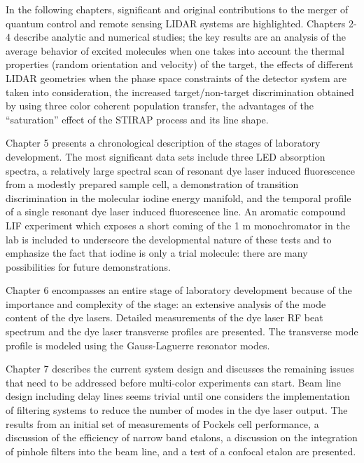 In the following chapters, significant and original contributions to the merger of quantum control and remote sensing LIDAR systems are highlighted. Chapters 2-4 describe analytic and numerical studies; the key results are an analysis of the average behavior of excited molecules when one takes into account the thermal properties (random orientation and velocity) of the target, the effects of different LIDAR geometries when the phase space constraints of the detector system are taken into consideration, the increased target/non-target discrimination obtained by using three color coherent population transfer, the advantages of the ``saturation'' effect of the STIRAP process and its line shape.

Chapter 5 presents a chronological description of the stages of laboratory development. The most significant data sets include three LED absorption spectra, a relatively large spectral scan of resonant dye laser induced fluorescence from a modestly prepared sample cell, a demonstration of transition discrimination in the molecular iodine energy manifold, and the temporal profile of a single resonant dye laser induced fluorescence line. An aromatic compound LIF experiment which exposes a short coming of the 1 m monochromator in the lab is included to underscore the developmental nature of these tests and to emphasize the fact that iodine is only a trial molecule: there are many possibilities for future demonstrations.

Chapter 6 encompasses an entire stage of laboratory development because of the importance and complexity of the stage: an extensive analysis of the mode content of the dye lasers. Detailed measurements of the dye laser RF beat spectrum and the dye laser transverse profiles are presented. The transverse mode profile is modeled using the Gauss-Laguerre resonator modes. 

Chapter 7 describes the current system design and discusses the remaining issues that need to be addressed before multi-color experiments can start. Beam line design including delay lines seems trivial until one considers the implementation of filtering systems to reduce the number of modes in the dye laser output. The results from an initial set of measurements of Pockels cell performance, a discussion of the efficiency of narrow band etalons, a discussion on the integration of pinhole filters into the beam line, and a test of a confocal etalon are presented.

